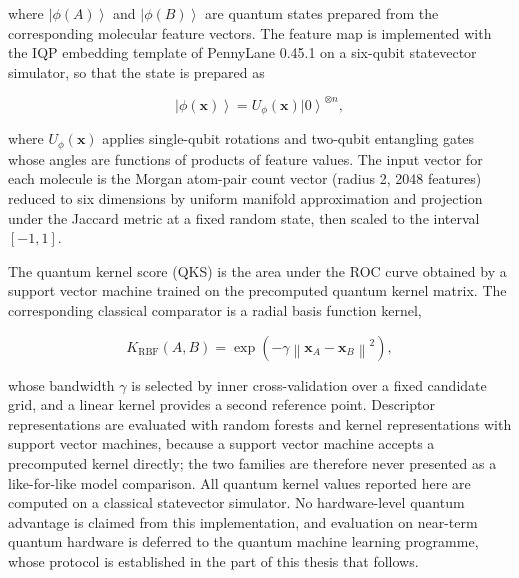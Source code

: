 where $\left| \phi(A) \right\rangle$ and $\left| \phi(B) \right\rangle$ are quantum states prepared from the corresponding molecular feature vectors. The feature map is implemented with the IQP embedding template of PennyLane 0.45.1 on a six-qubit statevector simulator, so that the state is prepared as

\begin{equation}
\left| \phi(\mathbf{x}) \right\rangle = U_{\phi}(\mathbf{x}) \left| 0 \right\rangle^{\otimes n},
\end{equation}

where $U_{\phi}(\mathbf{x})$ applies single-qubit rotations and two-qubit entangling gates whose angles are functions of products of feature values. The input vector for each molecule is the Morgan atom-pair count vector (radius \num{2}, \num{2048} features) reduced to six dimensions by uniform manifold approximation and projection under the Jaccard metric at a fixed random state, then scaled to the interval $[-1, 1]$.

The quantum kernel score (QKS) is the area under the ROC curve obtained by a support vector machine trained on the precomputed quantum kernel matrix. The corresponding classical comparator is a radial basis function kernel,

\begin{equation}
K_{\mathrm{RBF}}(A, B) = \exp \left( -\gamma \left\| \mathbf{x}_{A} - \mathbf{x}_{B} \right\|^{2} \right),
\end{equation}

whose bandwidth $\gamma$ is selected by inner cross-validation over a fixed candidate grid, and a linear kernel provides a second reference point. Descriptor representations are evaluated with random forests and kernel representations with support vector machines, because a support vector machine accepts a precomputed kernel directly; the two families are therefore never presented as a like-for-like model comparison. All quantum kernel values reported here are computed on a classical statevector simulator. No hardware-level quantum advantage is claimed from this implementation, and evaluation on near-term quantum hardware is deferred to the quantum machine learning programme, whose protocol is established in the part of this thesis that follows.

